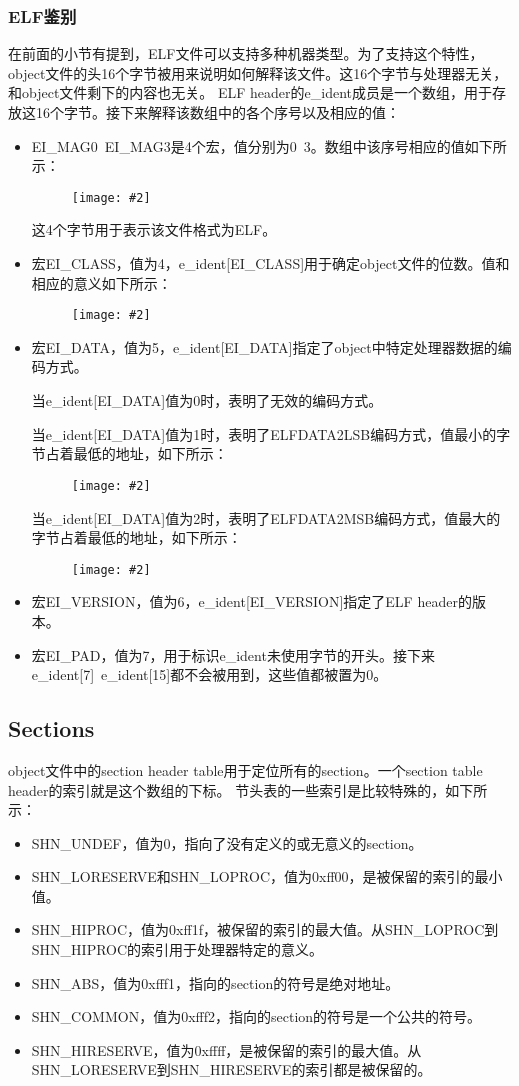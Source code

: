 \documentclass[a4paper,left=2.5cm,right=2.5cm,11pt]{article}
\newcommand{\sizedfic}[2]{\begin{figure}[H]
		\center
		\texttt{[image: \#2]}
	\end{figure}}
\begin{document}
\subsubsection{ELF鉴别}
	在前面的小节有提到，ELF文件可以支持多种机器类型。为了支持这个特性，object文件的头16个字节被用来说明如何解释该文件。这16个字节与处理器无关，和object文件剩下的内容也无关。
	ELF header的e\_ident成员是一个数组，用于存放这16个字节。接下来解释该数组中的各个序号以及相应的值：
	\begin{itemize}
		\item EI\_MAG0~EI\_MAG3是4个宏，值分别为0~3。数组中该序号相应的值如下所示：
		\sizedfic{0.5}{12.png}

		这4个字节用于表示该文件格式为ELF。

		\item 宏EI\_CLASS，值为4，e\_ident[EI\_CLASS]用于确定object文件的位数。值和相应的意义如下所示：
		\sizedfic{0.5}{13.png}

		\item 宏EI\_DATA，值为5，e\_ident[EI\_DATA]指定了object中特定处理器数据的编码方式。\par
			当e\_ident[EI\_DATA]值为0时，表明了无效的编码方式。\par
			当e\_ident[EI\_DATA]值为1时，表明了ELFDATA2LSB编码方式，值最小的字节占着最低的地址，如下所示：
			\sizedfic{0.7}{14.png}

			当e\_ident[EI\_DATA]值为2时，表明了ELFDATA2MSB编码方式，值最大的字节占着最低的地址，如下所示：
			\sizedfic{0.7}{15.png}

		\item 宏EI\_VERSION，值为6，e\_ident[EI\_VERSION]指定了ELF header的版本。
		\item 宏EI\_PAD，值为7，用于标识e\_ident未使用字节的开头。接下来e\_ident[7]~e\_ident[15]都不会被用到，这些值都被置为0。
	\end{itemize}

\subsection{Sections}
	object文件中的section header table用于定位所有的section。一个section table header的索引就是这个数组的下标。
	节头表的一些索引是比较特殊的，如下所示：
	\begin{itemize}
		\item SHN\_UNDEF，值为0，指向了没有定义的或无意义的section。
		\item SHN\_LORESERVE和SHN\_LOPROC，值为0xff00，是被保留的索引的最小值。
		\item SHN\_HIPROC，值为0xff1f，被保留的索引的最大值。从SHN\_LOPROC到SHN\_HIPROC的索引用于处理器特定的意义。
		\item SHN\_ABS，值为0xfff1，指向的section的符号是绝对地址。
		\item SHN\_COMMON，值为0xfff2，指向的section的符号是一个公共的符号。
		\item SHN\_HIRESERVE，值为0xffff，是被保留的索引的最大值。从SHN\_LORESERVE到SHN\_HIRESERVE的索引都是被保留的。
	\end{itemize}
\end{document}
